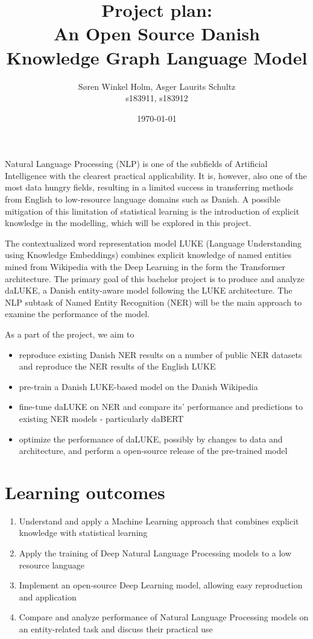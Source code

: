 \documentclass[12pt,fleqn]{article}
\title{
    Project plan:\\
    An Open Source Danish Knowledge Graph Language Model
}
\author{Søren Winkel Holm, Asger Laurits Schultz\\s183911, s183912}
\date{\today}
\begin{document}
\maketitle\noindent
Natural Language Processing (NLP) is one of the subfields of Artificial Intelligence with the clearest practical applicability.
It is, however, also one of the most data hungry fields, resulting in a limited success in transferring methods from English to low-resource language domains such as Danish.
A possible mitigation of this limitation of statistical learning is the introduction of explicit knowledge in the modelling, which will be explored in this project.

The contextualized word representation model LUKE (Language Understanding using Knowledge Embeddings) combines explicit knowledge of named entities mined from Wikipedia with the Deep Learning in the form the Transformer architecture. %
The primary goal of this bachelor project is to produce and analyze daLUKE, a Danish entity-aware model following the LUKE architecture.
The NLP subtask of Named Entity Recognition (NER) will be the main approach to examine the performance of the model.

As a part of the project, we aim to
\begin{itemize}
    \item reproduce existing Danish NER results on a number of public NER datasets and reproduce the NER results of the English LUKE
    \item pre-train a Danish LUKE-based model on the Danish Wikipedia
    \item fine-tune daLUKE on NER and compare its' performance and predictions to existing NER models - particularly daBERT
    \item optimize the performance of daLUKE, possibly by changes to data and architecture, and perform a open-source release of the pre-trained model
\end{itemize}

\section*{Learning outcomes}%
\begin{enumerate}
    \item Understand and apply a Machine Learning approach that combines explicit knowledge with statistical learning
    \item Apply the training of Deep Natural Language Processing models to a low resource language
    \item Implement an open-source Deep Learning model, allowing easy reproduction and application
    \item Compare and analyze performance of Natural Language Processing models on an entity-related task and discuss their practical use
\end{enumerate}
\end{document}
